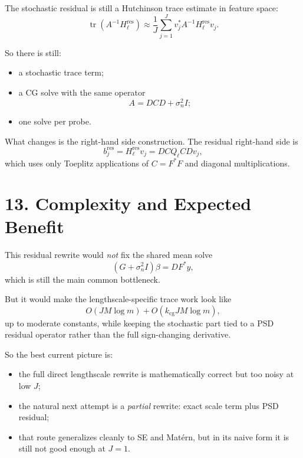 \documentclass[11pt]{article}
\begin{document}
The stochastic residual is still a Hutchinson trace estimate in feature space:
\begin{equation}
\operatorname{tr}\!\left(A^{-1} H_\ell^{\mathrm{res}}\right)
\approx
\frac{1}{J}\sum_{j=1}^J v_j^\ast A^{-1} H_\ell^{\mathrm{res}} v_j.
\end{equation}

So there is still:
\begin{itemize}
  \item a stochastic trace term;
  \item a CG solve with the same operator
  \[
    A = D C D + \sigma_n^2 I;
  \]
  \item one solve per probe.
\end{itemize}

What changes is the right-hand side construction. The residual right-hand side
is
\begin{equation}
b_j^{\mathrm{res}}
=
H_\ell^{\mathrm{res}} v_j
=
D C Q_\ell C D v_j,
\end{equation}
which uses only Toeplitz applications of $C = F^\ast F$ and diagonal
multiplications.

\section*{13. Complexity and Expected Benefit}

This residual rewrite would \emph{not} fix the shared mean solve
\[
(G + \sigma_n^2 I)\beta = D F^\ast y,
\]
which is still the main common bottleneck.

But it would make the lengthscale-specific trace work look like
\begin{equation}
O\!\left(J M \log m\right)
+
O\!\left(k_{\mathrm{cg}} J M \log m\right),
\end{equation}
up to moderate constants, while keeping the stochastic part tied to a PSD
residual operator rather than the full sign-changing derivative.

So the best current picture is:
\begin{itemize}
  \item the full direct lengthscale rewrite is mathematically correct but too
  noisy at low $J$;
  \item the natural next attempt is a \emph{partial} rewrite:
  exact scale term plus PSD residual;
  \item that route generalizes cleanly to SE and Mat\'ern, but in its naive form
  it is still not good enough at $J=1$.
\end{itemize}
\end{document}
